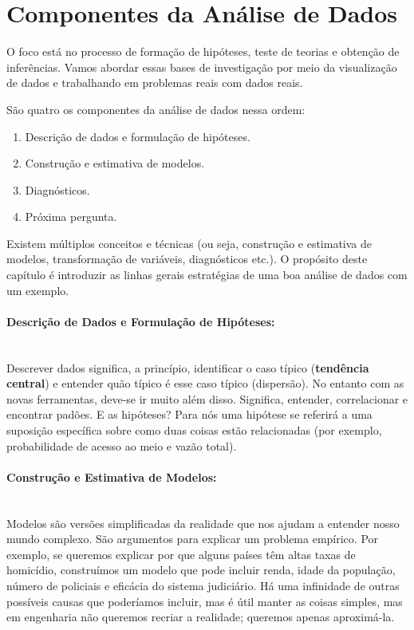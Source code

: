 \documentclass[article]{memoir}
\begin{document}
\section{Componentes da Análise de Dados}
O foco está no processo de formação de hipóteses, teste de teorias e obtenção de inferências. Vamos abordar  essas bases de investigação por meio da visualização de dados e trabalhando em problemas reais com dados reais.

São quatro os componentes da análise de dados  nessa ordem: 
\begin{enumerate}
	\item Descrição de dados e formulação de hipóteses.
	\item Construção e estimativa de modelos. 
	\item Diagnósticos.
	\item Próxima pergunta. 
\end{enumerate}

	Existem múltiplos conceitos e técnicas (ou seja, construção e estimativa de modelos, transformação de variáveis, diagnósticos etc.). O propósito deste capítulo é introduzir as linhas gerais estratégias de uma boa análise de dados com um exemplo. 

\paragraph*{Descrição de Dados e Formulação de Hipóteses:}\mbox{}\\

Descrever dados significa, a princípio, identificar o caso típico (\textbf{tendência central}) e entender quão típico é esse caso típico (dispersão). No entanto com as novas ferramentas, deve-se ir muito além disso. Significa, entender, correlacionar e encontrar padões.
E as hipóteses? Para nós uma hipótese se referirá a uma suposição específica sobre como duas coisas estão relacionadas (por exemplo, probabilidade de acesso ao meio e vazão total). 

\paragraph*{Construção e Estimativa de Modelos:}\mbox{}\\

Modelos são versões simplificadas da realidade que nos ajudam a entender nosso mundo complexo. São argumentos  para explicar um problema empírico. Por exemplo, se queremos explicar por que alguns países têm altas taxas de homicídio, construímos um modelo que pode incluir renda, idade da população, número de policiais e eficácia do sistema judiciário. Há uma infinidade de outras possíveis causas que poderíamos incluir, mas é útil manter as coisas simples, mas em engenharia não queremos recriar a realidade; queremos apenas aproximá-la. 
\end{document}
